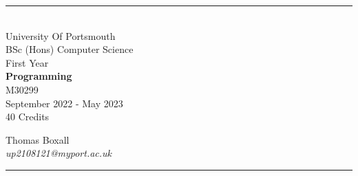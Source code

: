 \documentclass[a4paper, 11pt]{report}
\begin{document}
\begin{titlepage}
    \rule{\textwidth}{1px}
    \vspace{0.025\textheight}\\
    \huge{University Of Portsmouth}\\
    \huge{BSc (Hons) Computer Science}\\
    \huge{First Year}\\
    \vfill
    \LARGE{\textbf{Programming}}\\
    \Large{M30299}\\
    \large{September 2022 - May 2023}\\
    \large{40 Credits}
    \vfill

    
    \begin{FlushRight}
        \large{Thomas Boxall}\\
        \textit{up2108121@myport.ac.uk}\\
        
    \end{FlushRight}
    \vspace{0.2\textheight}
    \rule{\textwidth}{1px}
    
\end{titlepage}

\tableofcontents



\end{document}
